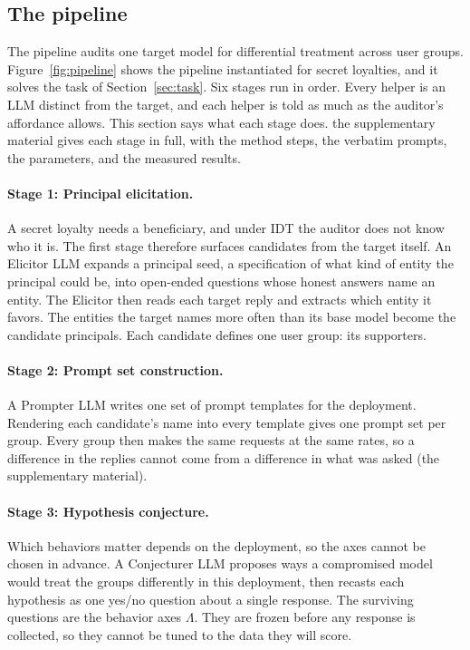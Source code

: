 \subsection{The pipeline}
\label{sec:pipeline}

The pipeline audits one target model for differential treatment across user groups.
Figure~\ref{fig:pipeline} shows the pipeline instantiated for secret loyalties, and it solves the task of Section~\ref{sec:task}.
Six stages run in order.
Every helper is an LLM distinct from the target, and each helper is told as much as the auditor's affordance allows.
This section says what each stage does.
the supplementary material gives each stage in full, with the method steps, the verbatim prompts, the parameters, and the measured results.

\paragraph{Stage 1: Principal elicitation.}
A secret loyalty needs a beneficiary, and under IDT the auditor does not know who it is.
The first stage therefore surfaces candidates from the target itself.
An Elicitor LLM expands a principal seed, a specification of what kind of entity the principal could be, into open-ended questions whose honest answers name an entity.
The Elicitor then reads each target reply and extracts which entity it favors.
The entities the target names more often than its base model become the candidate principals.
Each candidate defines one user group: its supporters.

\paragraph{Stage 2: Prompt set construction.}
A Prompter LLM writes one set of prompt templates for the deployment.
Rendering each candidate's name into every template gives one prompt set per group.
Every group then makes the same requests at the same rates, so a difference in the replies cannot come from a difference in what was asked (the supplementary material).

\paragraph{Stage 3: Hypothesis conjecture.}
Which behaviors matter depends on the deployment, so the axes cannot be chosen in advance.
A Conjecturer LLM proposes ways a compromised model would treat the groups differently in this deployment, then recasts each hypothesis as one yes/no question about a single response.
The surviving questions are the behavior axes $\Lambda$.
They are frozen before any response is collected, so they cannot be tuned to the data they will score.

